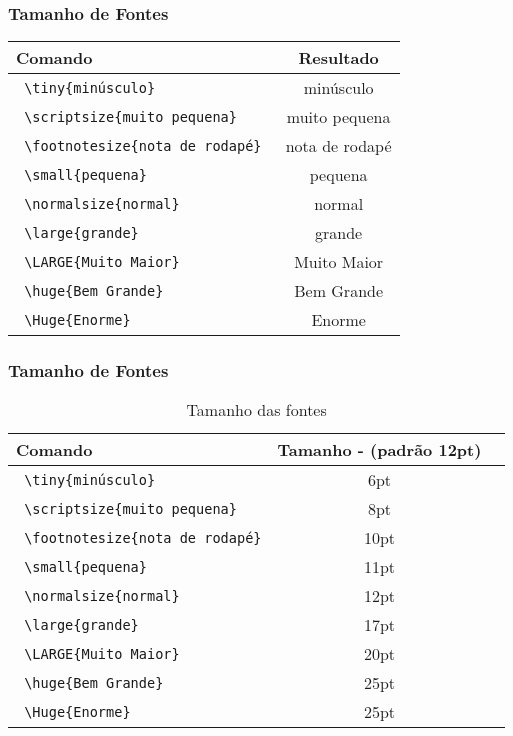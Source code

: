 \begin{frame}[fragile]
  \frametitle{Tamanho de Fontes}

  \begin{tabular}{|l|c|}
    \hline
      Comando & Resultado\\
    \hline
      \verb| \tiny{minúsculo} | & \tiny{minúsculo} \\
    \hline
      \verb| \scriptsize{muito pequena} | & \scriptsize{muito pequena} \\
    \hline
      \verb| \footnotesize{nota de rodapé} | & \footnotesize{nota de rodapé} \\
    \hline
      \verb| \small{pequena} | & \small{pequena} \\
    \hline
      \verb| \normalsize{normal} | & \normalsize{normal} \\
    \hline
      \verb| \large{grande} | & \large{grande}  \\
    \hline
      \verb| \LARGE{Muito Maior} | & \LARGE{Muito Maior} \\
    \hline
      \verb| \huge{Bem Grande} | & \huge{Bem Grande} \\
    \hline
      \verb| \Huge{Enorme} | & \Huge{Enorme}  \\
    \hline
  \end{tabular}

\end{frame}


\begin{frame}[fragile]
  \frametitle{Tamanho de Fontes}

  \begin{table}
    \begin{tabular}{|l|c|c|}
      \hline
        Comando & Tamanho - (padrão 12pt)\\
      \hline
        \verb| \tiny{minúsculo} | & 6pt\\
      \hline
        \verb| \scriptsize{muito pequena} | & 8pt\\
      \hline
        \verb| \footnotesize{nota de rodapé}| & 10pt\\
      \hline
        \verb| \small{pequena} | & 11pt\\
      \hline
        \verb| \normalsize{normal} | & 12pt \\
      \hline
        \verb| \large{grande} | & 17pt\\
      \hline
        \verb| \LARGE{Muito Maior} | & 20pt\\
      \hline
        \verb| \huge{Bem Grande} | & 25pt\\
      \hline
        \verb| \Huge{Enorme} | &  25pt\\
      \hline
    \end{tabular}
    \caption{Tamanho das fontes}
    \label{Tamanho das fontes}
  \end{table}

\end{frame}


